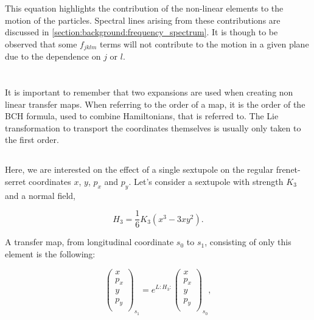 This equation highlights the contribution of the non-linear elements to the motion of the particles.
Spectral lines arising from these contributions are discussed in
\cref{section:background:frequency_spectrum}.
It is though to be observed that some $f_{jklm}$ terms will not contribute to the motion in a given
plane due to the dependence on $j$ or $l$.



\section{}
\label{subsection:coordinate_systems:example_of_maps}

It is important to remember that two expansions are used when creating non linear transfer maps.
When referring to the order of a map, it is the order of the BCH formula, used to combine
Hamiltonians, that is referred to.
The Lie transformation to transport the coordinates themselves is usually only taken to the first
order.

\subsection{}

Here, we are interested on the effect of a single sextupole on the regular frenet-serret coordinates
$x$, $y$, $p_x$ and $p_y$.
Let's consider a sextupole with strength $K_3$ and a normal field,

\begin{equation}
    H_3 = \frac{1}{6} K_3 (x^3 - 3xy^2).
\end{equation}

A transfer map, from longitudinal coordinate $s_0$ to $s_1$, consisting of only this element is the
following:

\begin{equation}
    \begin{pmatrix}
        x \\
        p_x \\
        y \\
        p_y \\
    \end{pmatrix}_{s_1}
    =
    e^{L:H_3:}
    \begin{pmatrix}
        x \\
        p_x \\
        y \\
        p_y \\
    \end{pmatrix}_{s_0},
    \label{eq:coordinate_systems:single_sextupole_lie_transfer}
\end{equation}

